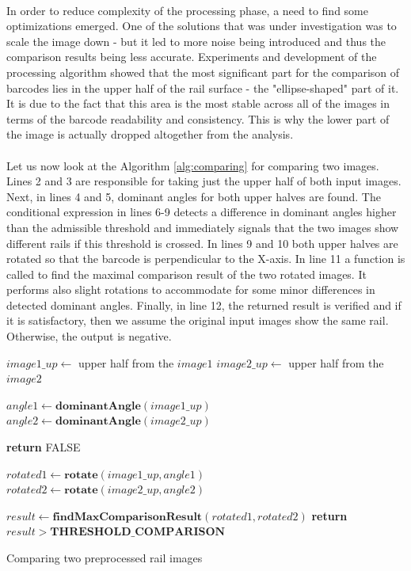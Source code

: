 \paragraph{}
In order to reduce complexity of the processing phase, a need to find some optimizations emerged. One of the solutions that was under investigation was to scale the image down - but it led to more noise being introduced and thus the comparison results being less accurate. Experiments and development of the processing algorithm showed that the most significant part for the comparison of barcodes lies in the upper half of the rail surface - the "ellipse-shaped" part of it. It is due to the fact that this area is the most stable across all of the images in terms of the barcode readability and consistency. This is why the lower part of the image is actually dropped altogether from the analysis.

\paragraph{}
Let us now look at the Algorithm \ref{alg:comparing} for comparing two images. Lines 2 and 3 are responsible for taking just the upper half of both input images. Next, in lines 4 and 5, dominant angles for both upper halves are found. The conditional expression in lines 6-9 detects a difference in dominant angles higher than the admissible threshold and immediately signals that the two images show different rails if this threshold is crossed. In lines 9 and 10 both upper halves are rotated so that the barcode is perpendicular to the X-axis. In line 11 a function is called to find the maximal comparison result of the two rotated images. It performs also slight rotations to accommodate for some minor differences in detected dominant angles. Finally, in line 12, the returned result is verified and if it is satisfactory, then we assume the original input images show the same rail. Otherwise, the output is negative. 

\begin{algorithm}
	\begin{spacing}{1.5}
	\begin{algorithmic}[1]
			\State $image1\_up \gets$ upper half from the $image1$
			\State $image2\_up \gets$ upper half from the $image2$
			
			\State $angle1 \gets \textbf{dominantAngle}(image1\_up)$
			\State $angle2 \gets \textbf{dominantAngle}(image2\_up)$
			
				\State \textbf{return} FALSE
			\EndIf
			
			\State $rotated1 \gets \textbf{rotate}(image1\_up, angle1)$
			\State $rotated2 \gets \textbf{rotate}(image2\_up, angle2)$
			
			\State $result \gets \textbf{findMaxComparisonResult}(rotated1, rotated2)$
			\State \textbf{return} $result > \textbf{THRESHOLD\_COMPARISON}$
		\EndFunction
	\end{algorithmic}
	\end{spacing}
	\caption{Comparing two preprocessed rail images}
	\label{alg:comparing}
\end{algorithm}

